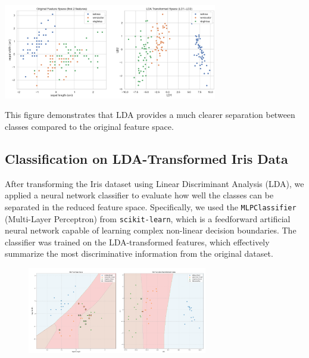 \documentclass[12pt,a4paper]{article}
\begin{document}
\begin{center}
    \includegraphics[width=0.7\textwidth]{images/irish_compare.png}
\end{center}

This figure demonstrates that LDA provides a much clearer separation between classes compared to the original feature space.

\subsection{Classification on LDA-Transformed Iris Data}

After transforming the Iris dataset using Linear Discriminant Analysis (LDA), we applied a neural network classifier to evaluate how well the classes can be separated in the reduced feature space. Specifically, we used the \texttt{MLPClassifier} (Multi-Layer Perceptron) from \texttt{scikit-learn}, which is a feedforward artificial neural network capable of learning complex non-linear decision boundaries. The classifier was trained on the LDA-transformed features, which effectively summarize the most discriminative information from the original dataset.

\begin{figure}[h!]
    \centering
    \includegraphics[width=0.7\textwidth]{images/mlp_lda.png}
\end{figure}
\end{document}
